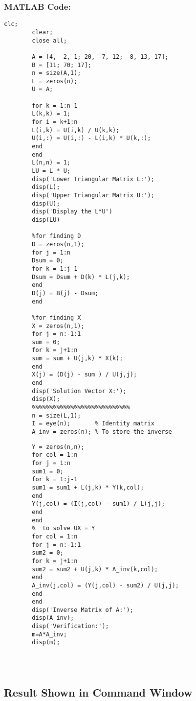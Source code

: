 \documentclass[a4paper,12pt]{article}
\begin{document}
	\subsubsection{MATLAB Code:}
	\begin{lstlisting}[style=vscode-light, caption={Solving Non-linear Equation Using LU Decomposition in MATLAB.} ]
		clc;
		clear;
		close all;
		
		A = [4, -2, 1; 20, -7, 12; -8, 13, 17];
		B = [11; 70; 17];
		n = size(A,1);
		L = zeros(n); 
		U = A;        
		
		for k = 1:n-1
		L(k,k) = 1; 
		for i = k+1:n
		L(i,k) = U(i,k) / U(k,k);
		U(i,:) = U(i,:) - L(i,k) * U(k,:);
		end
		end
		L(n,n) = 1; 
		LU = L * U;
		disp('Lower Triangular Matrix L:');
		disp(L);
		disp('Upper Triangular Matrix U:');
		disp(U);
		disp('Display the L*U')
		disp(LU)
		
		%for finding D
		D = zeros(n,1);
		for j = 1:n
		Dsum = 0;
		for k = 1:j-1
		Dsum = Dsum + D(k) * L(j,k);
		end
		D(j) = B(j) - Dsum;
		end
		
		%for finding X
		X = zeros(n,1);
		for j = n:-1:1
		sum = 0;
		for k = j+1:n
		sum = sum + U(j,k) * X(k);
		end
		X(j) = (D(j) - sum ) / U(j,j);
		end
		disp('Solution Vector X:');
		disp(X);
		%%%%%%%%%%%%%%%%%%%%%%%%%%%%
		n = size(L,1);
		I = eye(n);       % Identity matrix
		A_inv = zeros(n); % To store the inverse
			\end{lstlisting}
			\newpage
            \begin{lstlisting}[style=vscode-light, caption={Solving Non-linear Equation Using LU Decomposition in MATLAB.} ]
		%  to solve LY = I
		Y = zeros(n,n);
		for col = 1:n
		for j = 1:n
		sum1 = 0;
		for k = 1:j-1
		sum1 = sum1 + L(j,k) * Y(k,col);
		end
		Y(j,col) = (I(j,col) - sum1) / L(j,j);
		end
		end
		%  to solve UX = Y
		for col = 1:n
		for j = n:-1:1
		sum2 = 0;
		for k = j+1:n
		sum2 = sum2 + U(j,k) * A_inv(k,col);
		end
		A_inv(j,col) = (Y(j,col) - sum2) / U(j,j);
		end
		end
		disp('Inverse Matrix of A:');
		disp(A_inv);
		disp('Verification:');
		m=A*A_inv;
		disp(m);
		
		
		
	\end{lstlisting}
	
	
	
	
	\subsection{Result Shown in Command Window}
	
\end{document}

